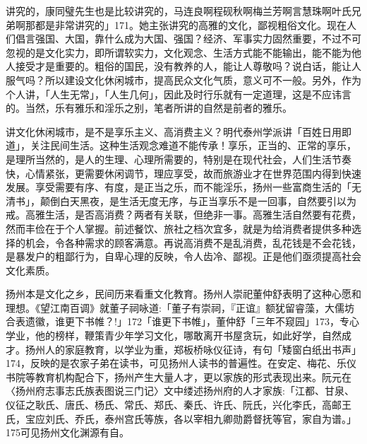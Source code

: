 \vfill
\begin{BookNotes}
\end{BookNotes}

\noindent 讲究的，康同璧先生也是比较讲究的，马连良啊程砚秋啊梅兰芳啊言慧珠啊叶氏兄弟啊那都是非常讲究的」171。她主张讲究的高雅的文化，鄙视粗俗文化。现在人们倡言强国、大国，靠什么成为大国、强国？经济、军事实力固然重要，不过不可忽视的是文化实力，即所谓软实力，文化观念、生活方式能不能输出，能不能为他人接受才是重要的。粗俗的国民，没有教养的人，能让人尊敬吗？说白话，能让人服气吗？所以建设文化休闲城市，提高民众文化气质，意义可不一般。另外，作为个人讲，「人生无常」，「人生几何」，因此及时行乐就有一定道理，这是不应讳言的。当然，乐有雅乐和淫乐之别，笔者所讲的自然是前者的雅乐。

讲文化休闲城市，是不是享乐主义、高消费主义？明代泰州学派讲「百姓日用即道」，关注民间生活。这种生活观念难道不能传承！享乐，正当的、正常的享乐，是理所当然的，是人的生理、心理所需要的，特别是在现代社会，人们生活节奏快，心情紧张，更需要休闲调节，理应享受，故而旅游业才在世界范围内得到快速发展。享受需要有序、有度，是正当之乐，而不能淫乐，扬州一些富商生活的「无清书」，颠倒白天黑夜，是生活无度无序，与正当享乐不是一回事，自然要引以为戒。高雅生活，是否高消费？两者有关联，但绝非一事。高雅生活自然要有花费，然而丰俭在于个人掌握。前述餐饮、旅社之档次宜多，就是为给消费者提供多种选择的机会，令各种需求的顾客满意。再说高消费不是乱消费，乱花钱是不会花钱，是暴发户的粗鄙行为，自卑心理的反映，令人齿冷、鄙视。正是他们亟须提高社会文化素质。

\vfill
\begin{BookNotes}
\end{BookNotes}


扬州本是文化之乡，民间历来看重文化教育。扬州人崇祀董仲舒表明了这种心愿和理想。《望江南百调》就董子祠咏道:「董子有崇祠，『正谊』额犹留睿藻，大儒坊合表遗徽，谁更下书帷？!」172「谁更下书帷」，董仲舒「三年不窥园」173，专心学业，他的榜样，鞭策青少年学习文化，哪敢离开书屋贪玩，如此好学，自然成才。扬州人的家庭教育，以学业为重，郑板桥咏仪征诗，有句「矮窗白纸出书声」174，反映的是农家子弟在读书，可见扬州人读书的普遍性。在安定、梅花、乐仪书院等教育机构配合下，扬州产生大量人才，更以家族的形式表现出来。阮元在〈扬州府志事志氏族表图说三门记〉文中缕述扬州府的人才家族:「江都、甘泉、仪征之耿氏、唐氏、杨氏、常氏、郑氏、秦氏、许氏、阮氏，兴化李氏，高邮王氏，宝应刘氏、乔氏，泰州宫氏等族，各以宰相九卿勋爵督抚等官，家自为谱。」175可见扬州文化渊源有自。

